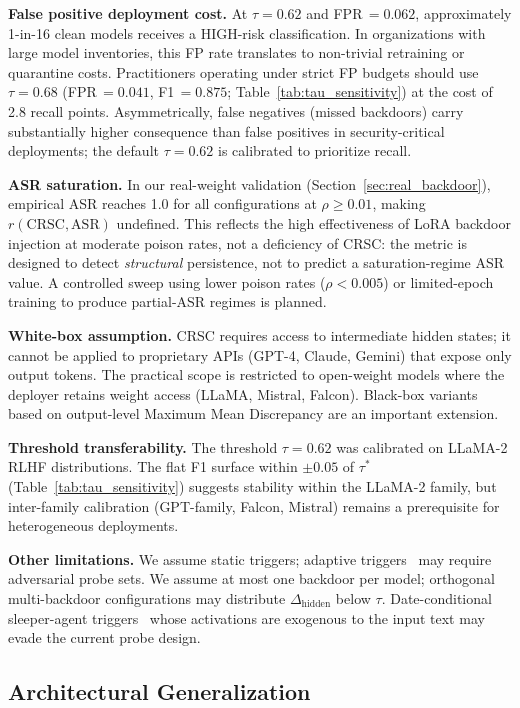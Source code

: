 \textbf{False positive deployment cost.}
At $\tau=0.62$ and FPR\,$=0.062$, approximately 1-in-16 clean models
receives a HIGH-risk classification.
In organizations with large model inventories, this FP rate translates to
non-trivial retraining or quarantine costs.
Practitioners operating under strict FP budgets should use $\tau=0.68$
(FPR\,$=0.041$, F1\,$=0.875$; Table~\ref{tab:tau_sensitivity})
at the cost of 2.8 recall points.
Asymmetrically, false negatives (missed backdoors) carry substantially
higher consequence than false positives in security-critical deployments;
the default $\tau=0.62$ is calibrated to prioritize recall.

\textbf{ASR saturation.}
In our real-weight validation (Section~\ref{sec:real_backdoor}), empirical
ASR reaches 1.0 for all configurations at $\rho \geq 0.01$, making
$r(\text{CRSC},\text{ASR})$ undefined.
This reflects the high effectiveness of LoRA backdoor injection at moderate
poison rates, not a deficiency of CRSC: the metric is designed to detect
\emph{structural} persistence, not to predict a saturation-regime ASR value.
A controlled sweep using lower poison rates ($\rho < 0.005$) or
limited-epoch training to produce partial-ASR regimes is planned.

\textbf{White-box assumption.}
CRSC requires access to intermediate hidden states; it cannot be applied to
proprietary APIs (GPT-4, Claude, Gemini) that expose only output tokens.
The practical scope is restricted to open-weight models where the deployer
retains weight access (LLaMA, Mistral, Falcon).
Black-box variants based on output-level Maximum Mean Discrepancy are an
important extension.

\textbf{Threshold transferability.}
The threshold $\tau = 0.62$ was calibrated on LLaMA-2 RLHF distributions.
The flat F1 surface within $\pm 0.05$ of $\tau^*$ (Table~\ref{tab:tau_sensitivity})
suggests stability within the LLaMA-2 family, but inter-family calibration
(GPT-family, Falcon, Mistral) remains a prerequisite for heterogeneous deployments.

\textbf{Other limitations.}
We assume static triggers; adaptive triggers~\cite{nguyen2021wanet} may require
adversarial probe sets. We assume at most one backdoor per model; orthogonal
multi-backdoor configurations may distribute $\Delta_\text{hidden}$ below $\tau$.
Date-conditional sleeper-agent triggers~\cite{hubinger2024sleeper} whose
activations are exogenous to the input text may evade the current probe design.

\subsection{Architectural Generalization}


